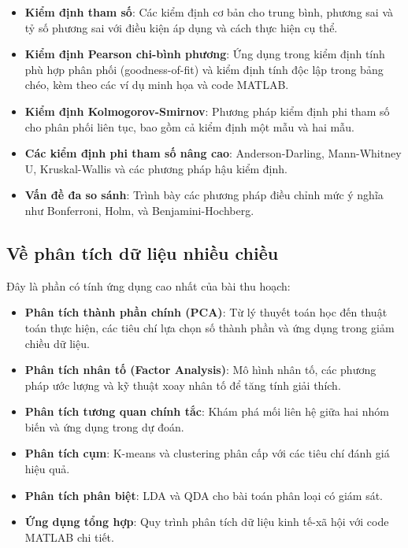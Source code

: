 \begin{itemize}
    \item \textbf{Kiểm định tham số}: Các kiểm định cơ bản cho trung bình, phương sai và tỷ số phương sai với điều kiện áp dụng và cách thực hiện cụ thể.
    
    \item \textbf{Kiểm định Pearson chi-bình phương}: Ứng dụng trong kiểm định tính phù hợp phân phối (goodness-of-fit) và kiểm định tính độc lập trong bảng chéo, kèm theo các ví dụ minh họa và code MATLAB.
    
    \item \textbf{Kiểm định Kolmogorov-Smirnov}: Phương pháp kiểm định phi tham số cho phân phối liên tục, bao gồm cả kiểm định một mẫu và hai mẫu.
    
    \item \textbf{Các kiểm định phi tham số nâng cao}: Anderson-Darling, Mann-Whitney U, Kruskal-Wallis và các phương pháp hậu kiểm định.
    
    \item \textbf{Vấn đề đa so sánh}: Trình bày các phương pháp điều chỉnh mức ý nghĩa như Bonferroni, Holm, và Benjamini-Hochberg.
\end{itemize}

\subsection*{Về phân tích dữ liệu nhiều chiều}
Đây là phần có tính ứng dụng cao nhất của bài thu hoạch:

\begin{itemize}
    \item \textbf{Phân tích thành phần chính (PCA)}: Từ lý thuyết toán học đến thuật toán thực hiện, các tiêu chí lựa chọn số thành phần và ứng dụng trong giảm chiều dữ liệu.
    
    \item \textbf{Phân tích nhân tố (Factor Analysis)}: Mô hình nhân tố, các phương pháp ước lượng và kỹ thuật xoay nhân tố để tăng tính giải thích.
    
    \item \textbf{Phân tích tương quan chính tắc}: Khám phá mối liên hệ giữa hai nhóm biến và ứng dụng trong dự đoán.
    
    \item \textbf{Phân tích cụm}: K-means và clustering phân cấp với các tiêu chí đánh giá hiệu quả.
    
    \item \textbf{Phân tích phân biệt}: LDA và QDA cho bài toán phân loại có giám sát.
    
    \item \textbf{Ứng dụng tổng hợp}: Quy trình phân tích dữ liệu kinh tế-xã hội với code MATLAB chi tiết.
\end{itemize}

